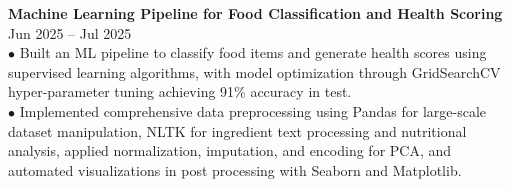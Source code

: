 \documentclass[10pt]{article}
\renewcommand{\section}[2]%
        {\pagebreak[3]\vspace{0.75\baselineskip}%
         \phantomsection\addcontentsline{toc}{section}{#1}%
         \hspace{0in}%
         \marginpar{
         \raggedright \small \scshape #1}#2}
\newcommand{\blankline}{\quad\pagebreak[2]\vspace{-0.3\baselineskip}}
\begin{document}
\blankline

\textbf{Machine Learning Pipeline for Food Classification and Health Scoring}
\hfill Jun 2025 -- Jul 2025 \\ 
$\bullet$ Built an ML pipeline to classify food items and generate health scores using supervised learning algorithms, with model optimization through GridSearchCV hyper-parameter tuning achieving 91\% accuracy in test. \\
$\bullet$ Implemented comprehensive data preprocessing using Pandas for large-scale dataset manipulation, NLTK for ingredient text processing and nutritional analysis, applied normalization, imputation, and encoding for PCA, and automated visualizations in post processing with Seaborn and Matplotlib.

\blankline







\end{document}
